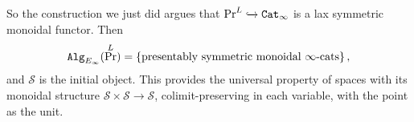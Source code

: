 \documentclass[12pt]{amsart}
\theoremstyle{definition}
\begin{document}
So the construction we just did argues that $\Pr^L \xhookrightarrow{} \texttt{Cat}_\infty$ is a lax symmetric monoidal functor. Then
\begin{align*}
    \texttt{Alg}_{E_\infty}(\Pr^L) = \left\{ \text{presentably symmetric monoidal } \infty\text{-cats} \right\},
\end{align*}
and $\mathcal{S}$ is the initial object. This provides the universal property of spaces with its monoidal structure $\mathcal{S} \times \mathcal{S} \to \mathcal{S}$, colimit-preserving in each variable, with the point as the unit.

\newpage

{}
\end{document}
